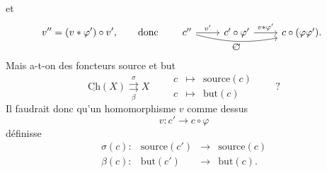 \documentclass[11pt]{article}
\newcommand{\printedpage}[1]{\if\relax\detokenize{#1}\relax\else\marginpar{\raggedright\footnotesize p.~#1}\fi}
\newcommand{\uCh}{\underline{\mathrm{Ch}}}
\newcommand{\circled}[1]{\text{\textcircled{$\scriptstyle #1$}}}
\begin{document}
et
\[
v''=(v*\varphi')\circ v', \qquad \text{donc} \qquad
\begin{tikzcd}
c'' \arrow[r, "v'"] \arrow[rr, bend right=12, "\circled{v''}"'] & c'\circ\varphi' \arrow[r, "v*\varphi'"] & c\circ(\varphi\varphi').
\end{tikzcd}
\]
Mais a-t-on des foncteurs source et but
\[
\uCh(X) \overset{\sigma}{\underset{\beta}{\rightrightarrows}} X \qquad
\begin{array}{ccl}
c & \longmapsto & \text{source}(c)\\[1ex]
c & \longmapsto & \text{but}(c)
\end{array}
\qquad ?
\]
Il faudrait donc qu'un homomorphisme $v$ comme dessus
\[
v : c' \longrightarrow c\circ\varphi
\]
définisse
\[
\begin{array}{lrcl}
\sigma(c) : & \text{source}(c') & \longrightarrow & \text{source}(c)\\[1ex]
\beta(c) : & \text{but}(c') & \longrightarrow & \text{but}(c).
\end{array}
\]

\printedpage{19}
\end{document}
